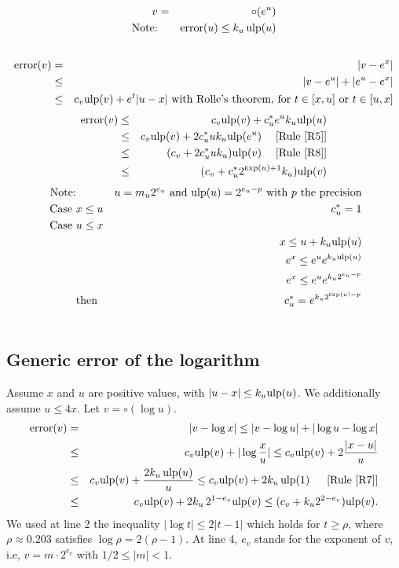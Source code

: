 \documentclass[12pt]{amsart}
\def\n{\textnormal}
\def\ulp{{\rm ulp}}
\def\Exp{{\rm \textsc exp}}
\newcommand{\U}[1]{\quad \mbox{[Rule~\ref{#1}]}}
\DeclareMathOperator{\error}{error}
\begin{document}
\begin{eqnarray}\nonumber
v&=&\circ(e^{u}) \\\nonumber
\textnormal{Note:}&& \error(u) \leq k_u \, \ulp(u)\\\nonumber
\end{eqnarray}
\begin{eqnarray}\nonumber
\error(v)& = &|v - e^{x}| \\\nonumber
& \leq &|v - e^{u}| +|e^{u} - e^{x}| \\\nonumber
& \leq & c_v \ulp(v) +  e^t |u-x| \n{ with Rolle's theorem, for } t\in[x,u]\n{ or }t\in[u,x]
\end{eqnarray}
\begin{eqnarray}\nonumber
\error(v)& \leq & c_v \ulp(v) +  c_u^* e^u k_u \ulp(u) \\\nonumber
& \leq & c_v \ulp(v) +  2 c_u^* u k_u \ulp(e^u) \;\U{R5}\\\nonumber
& \leq & (c_v +  2 c_u^* u k_u )\ulp(v) \;\U{R8}\\\nonumber
& \leq & (c_v +  c_u^* 2^{\Exp(u)+1} k_u )\ulp(v)
\end{eqnarray}
\begin{eqnarray}\nonumber
\textnormal{Note:}&& u= m_u 2^{e_u} \n{ and }\ulp(u)=2^{e_u-p} \n{ with } p \n{ the precision} \\\nonumber
\n{ Case }&x \leq u&  c_u^* =1 \\\nonumber
\n{ Case }&u \leq x& \\\nonumber
&&  x \leq u + k_u \ulp(u)\\\nonumber
&& e^x \leq e^u e^{k_u \ulp(u)}\\\nonumber
&&e^x \leq e^u e^{k_u 2^{e_u-p}}\\\nonumber
&\n{then}& c_u^* = e^{k_u 2^{\Exp(u)-p}}\\\nonumber
\end{eqnarray}

\subsection{Generic error of the logarithm}\label{generic:log}
Assume $x$ and $u$ are positive values,
with $|u - x| \leq k_u \ulp(u)$.
We additionally assume $u \leq 4x$. Let $v = \circ(\log u)$.
\begin{eqnarray}\nonumber
\error(v)& = &|v - \log x|
  \leq |v - \log u| +|\log u - \log x| \\\nonumber
& \leq & c_v \ulp(v) + |\log\frac{x}{u}|
  \leq   c_v \ulp(v) + 2 \frac{|x-u|}{u} \\\nonumber
& \leq & c_v \ulp(v) + \frac{2 k_u \, \ulp(u)}{u}
  \leq   c_v \ulp(v) + 2 k_u \, \ulp(1)\;\; \U{R7}\\\nonumber
& \leq & c_v \ulp(v) + 2 k_u \, 2^{1-e_v} \ulp(v)
  \leq   (c_v + k_u 2^{2-e_v}) \ulp(v).
\end{eqnarray}
We used at line 2 the inequality $|\log t| \leq 2 |t-1|$ which holds
for $t \geq \rho$, where $\rho \approx 0.203$ satisfies $\log \rho =2(\rho-1)$.
At line 4, $e_v$ stands for the exponent of $v$, i.e,
$v = m \cdot 2^{e_v}$ with $1/2 \leq |m| < 1$.
\end{document}
